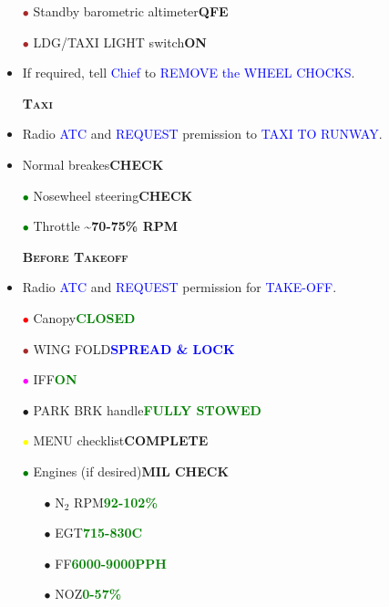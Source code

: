 \documentclass[a4paper,12pt,dvipsnames]{letter}
\newcommand{\radio}[1]{\textcolor{blue}{#1}}
\newcommand{\button}[1]{\textbf{#1}}
\newcommand{\degC}{\textdegree{}C}
\newcommand{\ok}[1]{\textcolor{Green}{\textbf{#1}}}
\newcommand{\boat}[1]{\textcolor{Blue}{\textbf{#1}}}
\newcommand{\myHead}[1]{{\LARGE\textsc{\textbf{#1}}}}
\newcommand{\bi}{\textcolor{ProcessBlue}{$\bullet$\;}}
\newcommand{\ri}{\textcolor{Red}{$\bullet$\;}}
\newcommand{\gi}{\textcolor{Green}{$\bullet$\;}}
\newcommand{\yi}{\textcolor{Yellow}{$\bullet$\;}}
\newcommand{\mi}{\textcolor{Magenta}{$\bullet$\;}}
\renewcommand{\ni}{\textcolor{Brown}{$\bullet$\;}}
\begin{document}
{\begin{itemize}
\begin{itemize}
  \item[\yi] R-DDI: FCS Page CH 1/3 of PROC row\dotfill\button{X}
 \end{itemize}  
 \item[\ni] Standby barometric altimeter\dotfill\button{QFE}
 \item[\ni] LDG/TAXI LIGHT switch\dotfill\button{ON}
 \item If required, tell \radio{Chief} to \radio{REMOVE the WHEEL CHOCKS}.
\end{itemize}
\newpage
\begin{itemize}
 \item[] \myHead{Taxi}
 \item Radio \radio{ATC} and \radio{REQUEST} premission to \radio{TAXI TO RUNWAY}.
 \item Normal breakes\dotfill\button{CHECK}
 \item[\gi] Nosewheel steering\dotfill\button{CHECK}
 \item[\gi] Throttle \dotfill\button{\textasciitilde70-75\% RPM}
\end{itemize}
\vspace{0.5em}
\begin{itemize}
 \item[] \myHead{Before Takeoff}
 \item Radio \radio{ATC} and \radio{REQUEST} permission for \radio{TAKE-OFF}.
 \item[\ri] Canopy\dotfill\ok{CLOSED}
 \item[\ni] WING FOLD\dotfill\boat{SPREAD \& LOCK}
 \item[\mi] IFF\dotfill\ok{ON}
 \item[\bi] PARK BRK handle\dotfill\ok{FULLY STOWED}
 \item[\yi] MENU checklist\dotfill\button{COMPLETE}
 \item[\gi] Engines (if desired)\dotfill\button{MIL CHECK}
 \begin{itemize}
  \item[\bi] N$_2$ RPM\dotfill\ok{92-102\%}
  \item[\bi] EGT\dotfill\ok{715-830\degC}
  \item[\bi] FF\dotfill\ok{6000-9000\;PPH}
  \item[\bi] NOZ\dotfill\ok{0-57\%}

\end{itemize}
\end{itemize}}
\end{document}

